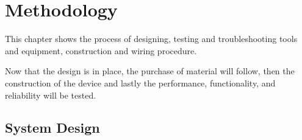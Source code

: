 \chapter{Methodology}

\vspace{-1cm}

This chapter shows the process of designing, testing and troubleshooting tools and equipment, construction and wiring procedure.

Now that the design is in place, the purchase of material will follow, then the construction of the device and lastly the performance,
functionality, and reliability will be tested.

\section{System Design}
